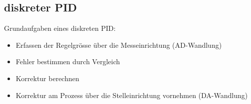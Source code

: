 \subsection{diskreter PID }
  Grundaufgaben eines diskreten PID:
  \begin{itemize}
    \item Erfassen der Regelgrösse über die Messeinrichtung (AD-Wandlung)
    \item Fehler bestimmen durch Vergleich
    \item Korrektur berechnen
    \item Korrektur am Prozess über die Stelleinrichtung vornehmen (DA-Wandlung)
  \end{itemize}



	